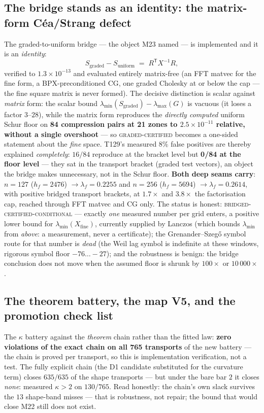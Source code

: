 \documentclass[11pt,a4paper]{article}
\begin{document}
\subsection{The bridge stands as an identity: the matrix-form C\'ea/Strang defect}
The graded-to-uniform bridge --- the object M23 named --- is implemented and it is an
\emph{identity}:
\[
S_{\mathrm{graded}}-S_{\mathrm{uniform}} \;=\; R^{\mathsf T}X^{-1}R ,
\]
verified to $1.3\times10^{-13}$ and evaluated entirely matrix-free (an FFT matvec for the
fine form, a BPX-preconditioned CG, one graded Cholesky at or below the cap --- the fine
square matrix is never formed). The decisive distinction is scalar against \emph{matrix}
form: the scalar bound $\lambda_{\min}(S_{\mathrm{graded}})-\lambda_{\max}(G)$ is vacuous
(it loses a factor $3$--$28$), while the matrix form reproduces the \emph{directly computed}
uniform Schur floor on \textbf{84 compression pairs at 21 zones to $2.5\times10^{-11}$
relative, without a single overshoot} --- so \textsc{graded-certified} becomes a one-sided
statement about the \emph{fine} space. T129's measured $8\%$ false positives are thereby
explained \emph{completely}: $16/84$ reproduce at the bracket level but \textbf{0/84 at the
floor level} --- they sat in the transport bracket (graded test vectors), an object the
bridge makes unnecessary, not in the Schur floor. \textbf{Both deep seams carry}: $n=127$
($h_f=2476$) $\to\lambda_f=0.2255$ and $n=256$ ($h_f=5694$) $\to\lambda_f=0.2614$, with
positive bridged transport brackets, at $1.7\times$ and $3.8\times$ the factorisation cap,
reached through FFT matvec and CG only. The status is honest:
\textsc{bridged-certified-conditional} --- exactly \emph{one} measured number per grid
enters, a positive lower bound for $\lambda_{\min}(X_{\mathrm{fine}})$, currently supplied
by Lanczos (which bounds $\lambda_{\min}$ from \emph{above}: a measurement, never a
certificate); the Grenander--Szeg\H{o} symbol route for that number is \emph{dead} (the Weil
lag symbol is indefinite at these windows, rigorous symbol floor $-76\ldots-27$); and the
robustness is benign: the bridge conclusion does not move when the assumed floor is shrunk
by $100\times$ or $10\,000\times$.

\subsection{The theorem battery, the map V5, and the promotion check list}
The $\kappa$ battery against the \emph{theorem} chain rather than the fitted law:
\textbf{zero violations of the exact chain on all 765 transports} of the new battery --- the
chain is proved per transport, so this is implementation verification, not a test. The
fully explicit chain (the D1 candidate substituted for the curvature term) closes
$635/635$ of the shape transports --- but under the bare bar $2$ it closes \emph{none}:
measured $\kappa>2$ on $130/765$. Read honestly: the chain's own slack survives the $13$
shape-band misses --- that is robustness, not repair; the bound that would close M22 still
does not exist.
\end{document}
